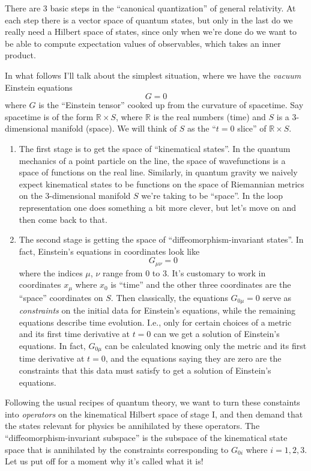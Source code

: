 \documentclass[12pt]{article}
\begin{document}
There are 3 basic steps in the ``canonical quantization'' of general
relativity. At each step there is a vector space of quantum states, but
only in the last do we really need a Hilbert space of states, since only
when we're done do we want to be able to compute expectation values of
observables, which takes an inner product.

In what follows I'll talk about the simplest situation, where we have
the \emph{vacuum} Einstein equations \[G = 0\] where \(G\) is the
``Einstein tensor'' cooked up from the curvature of spacetime. Say
spacetime is of the form \(\mathbb{R} \times S\), where \(\mathbb{R}\)
is the real numbers (time) and \(S\) is a \(3\)-dimensional manifold
(space). We will think of \(S\) as the ``\(t = 0\) slice'' of
\(\mathbb{R} \times S\).

\begin{enumerate}
\def\labelenumi{\Roman{enumi})}
\item
  The first stage is to get the space of ``kinematical states''. In the
  quantum mechanics of a point particle on the line, the space of
  wavefunctions is a space of functions on the real line. Similarly, in
  quantum gravity we naively expect kinematical states to be functions
  on the space of Riemannian metrics on the \(3\)-dimensional manifold
  \(S\) we're taking to be ``space''. In the loop representation one
  does something a bit more clever, but let's move on and then come back
  to that.
\item
  The second stage is getting the space of ``diffeomorphism-invariant
  states''. In fact, Einstein's equations in coordinates look like
  \[G_{\mu \nu} = 0\] where the indices \(\mu\), \(\nu\) range from 0 to
  3. It's customary to work in coordinates \(x_{\mu}\) where \(x_0\) is
  ``time'' and the other three coordinates are the ``space'' coordinates
  on \(S\). Then classically, the equations \(G_{0 \mu} = 0\) serve as
  \emph{constraints} on the initial data for Einstein's equations, while
  the remaining equations describe time evolution. I.e., only for
  certain choices of a metric and its first time derivative at \(t = 0\)
  can we get a solution of Einstein's equations. In fact, \(G_{0 \mu}\)
  can be calculated knowing only the metric and its first time
  derivative at \(t = 0\), and the equations saying they are zero are
  the constraints that this data must satisfy to get a solution of
  Einstein's equations.
\end{enumerate}

Following the usual recipes of quantum theory, we want to turn these
constaints into \emph{operators} on the kinematical Hilbert space of
stage I, and then demand that the states relevant for physics be
annihilated by these operators. The ``diffeomorphism-invariant
subspace'' is the subspace of the kinematical state space that is
annihilated by the constraints corresponding to \(G_{0i}\) where
\(i = 1, 2, 3\). Let us put off for a moment why it's called what it is!
\end{document}
